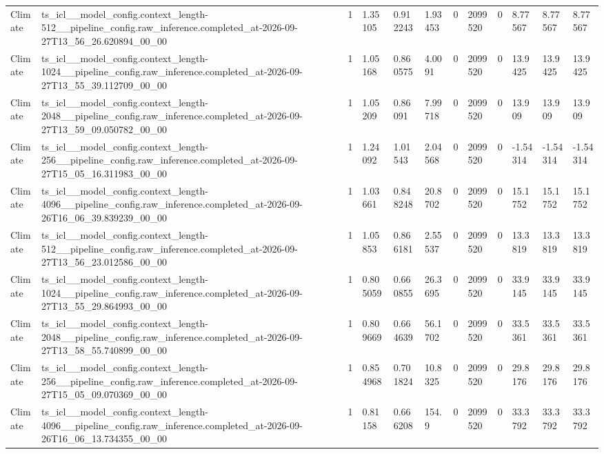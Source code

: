 \begin{tabular}{llllllllllll}
Climate & ts\_icl\_\_model\_config.context\_length-512\_\_pipeline\_config.raw\_inference.completed\_at-2026-09-27T13\_56\_26.620894\_00\_00 & 1 & 1.35105 & 0.912243 & 1.93453 & 0 & 2099520 & 0 & 8.77567 & 8.77567 & 8.77567 \\
Climate & ts\_icl\_\_model\_config.context\_length-1024\_\_pipeline\_config.raw\_inference.completed\_at-2026-09-27T13\_55\_39.112709\_00\_00 & 1 & 1.05168 & 0.860575 & 4.0091 & 0 & 2099520 & 0 & 13.9425 & 13.9425 & 13.9425 \\
Climate & ts\_icl\_\_model\_config.context\_length-2048\_\_pipeline\_config.raw\_inference.completed\_at-2026-09-27T13\_59\_09.050782\_00\_00 & 1 & 1.05209 & 0.86091 & 7.99718 & 0 & 2099520 & 0 & 13.909 & 13.909 & 13.909 \\
Climate & ts\_icl\_\_model\_config.context\_length-256\_\_pipeline\_config.raw\_inference.completed\_at-2026-09-27T15\_05\_16.311983\_00\_00 & 1 & 1.24092 & 1.01543 & 2.04568 & 0 & 2099520 & 0 & -1.54314 & -1.54314 & -1.54314 \\
Climate & ts\_icl\_\_model\_config.context\_length-4096\_\_pipeline\_config.raw\_inference.completed\_at-2026-09-26T16\_06\_39.839239\_00\_00 & 1 & 1.03661 & 0.848248 & 20.8702 & 0 & 2099520 & 0 & 15.1752 & 15.1752 & 15.1752 \\
Climate & ts\_icl\_\_model\_config.context\_length-512\_\_pipeline\_config.raw\_inference.completed\_at-2026-09-27T13\_56\_23.012586\_00\_00 & 1 & 1.05853 & 0.866181 & 2.55537 & 0 & 2099520 & 0 & 13.3819 & 13.3819 & 13.3819 \\
Climate & ts\_icl\_\_model\_config.context\_length-1024\_\_pipeline\_config.raw\_inference.completed\_at-2026-09-27T13\_55\_29.864993\_00\_00 & 1 & 0.805059 & 0.660855 & 26.3695 & 0 & 2099520 & 0 & 33.9145 & 33.9145 & 33.9145 \\
Climate & ts\_icl\_\_model\_config.context\_length-2048\_\_pipeline\_config.raw\_inference.completed\_at-2026-09-27T13\_58\_55.740899\_00\_00 & 1 & 0.809669 & 0.664639 & 56.1702 & 0 & 2099520 & 0 & 33.5361 & 33.5361 & 33.5361 \\
Climate & ts\_icl\_\_model\_config.context\_length-256\_\_pipeline\_config.raw\_inference.completed\_at-2026-09-27T15\_05\_09.070369\_00\_00 & 1 & 0.854968 & 0.701824 & 10.8325 & 0 & 2099520 & 0 & 29.8176 & 29.8176 & 29.8176 \\
Climate & ts\_icl\_\_model\_config.context\_length-4096\_\_pipeline\_config.raw\_inference.completed\_at-2026-09-26T16\_06\_13.734355\_00\_00 & 1 & 0.81158 & 0.666208 & 154.9 & 0 & 2099520 & 0 & 33.3792 & 33.3792 & 33.3792 \\

\end{tabular}
